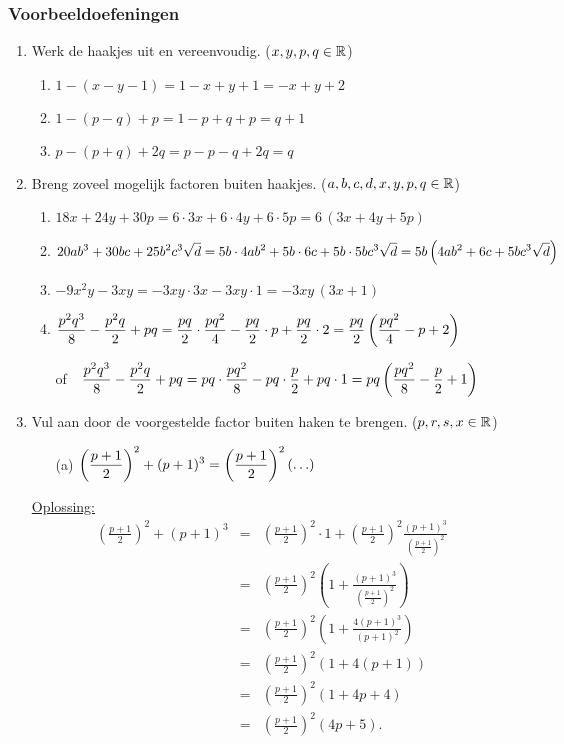 \documentclass{ximera}
\begin{document}
\subsubsection*{Voorbeeldoefeningen}
\begin{enumerate}
\item Werk de haakjes uit en vereenvoudig. ($x,y,p,q\in\mathbb{R}$)
\begin{enumerate}
\item $1-(x-y-1)=1-x+y+1=-x+y+2$
\item $1-(p-q)+p=1-p+q+p=q+1$
\item $p-(p+q)+2q=p-p-q+2q=q$
\end{enumerate}

\item Breng zoveel mogelijk factoren buiten haakjes. ($a,b,c,d,x,y,p,q\in\mathbb{R}$)
\begin{enumerate}
\item $18x+24y+30p=6\cdot3x+6\cdot4y+6\cdot5p=6\,(3x+4y+5p)$
\item $\displaystyle{20ab^3+30bc+25b^2c^3\sqrt{d}=5b\cdot4ab^2+5b\cdot6c+5b\cdot5bc^3\sqrt{d}=5b\left(4ab^2+6c+5bc^3\sqrt{d}\right)}$
\item $-9x^2y-3xy=-3xy\cdot3x-3xy\cdot1=-3xy\,(3x+1)$
\item $\displaystyle{\frac{p^2q^3}{8}-\frac{p^2q}{2}+pq=\frac{pq}{2}\cdot\frac{pq^2}{4}-\frac{pq}{2}\cdot p+\frac{pq}{2}\cdot 2=\frac{pq}{2}\left(\frac{pq^2}{4}-p+2\right)}$
\item[of\ \,] $\displaystyle{\frac{p^2q^3}{8}-\frac{p^2q}{2}+pq=pq\cdot\frac{pq^2}{8}-pq\cdot\frac{p}{2}+pq\cdot 1=pq\left(\frac{pq^2}{8}-\frac{p}{2}+1\right)}$
\end{enumerate}

\item Vul aan door de voorgestelde factor buiten haken te brengen. ($p,r,s,x\in\mathbb{R}$)
\begin{enumerate}
\item[(a)]
$\displaystyle{\left(\frac{p+1}{2}\right)^{2}+(p+1)^{3}=\left(\frac{p+1}{2}\right)^{2}(\ldots)}$
\end{enumerate}

\underline{Oplossing:}
\begin{eqnarray*}
\left(\frac{p+1}{2}\right)^{2}+(p+1)^{3}&=&\left(\frac{p+1}{2}\right)^{2}\cdot1+\left(\frac{p+1}{2}\right)^{2}\frac{\left(p+1\right)^{3}}{\left(\frac{p+1}{2}\right)^{2}}\\
&=&\left(\frac{p+1}{2}\right)^{2}\left(1+\frac{(p+1)^{3}}{\left(\frac{p+1}{2}\right)^{2}}\right)\\
&=&\left(\frac{p+1}{2}\right)^{2}\left(1+\frac{4(p+1)^{3}}{(p+1)^{2}}\right)\\
&=&\left(\frac{p+1}{2}\right)^{2}\left(1+4(p+1)\right)\\
&=&\left(\frac{p+1}{2}\right)^{2}\left(1+4p+4\right)\\
&=&\left(\frac{p+1}{2}\right)^{2}\left(4p+5\right).
\end{eqnarray*}


\end{enumerate}
\end{document}
